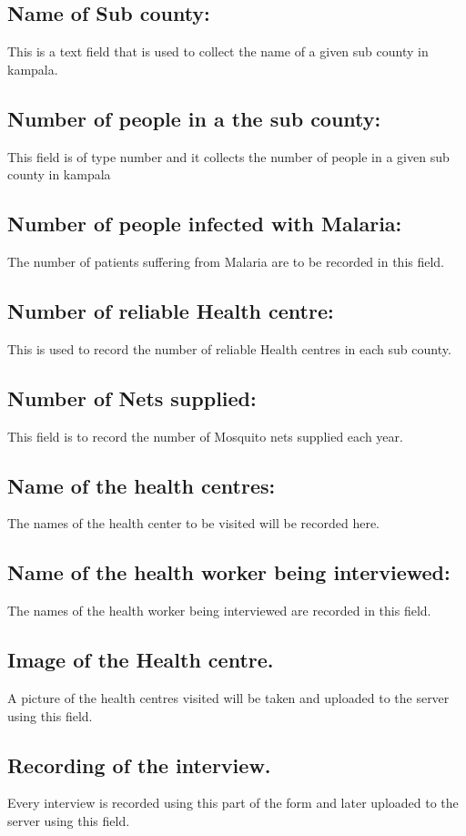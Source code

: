 \documentclass[a4paper,12pt]{article}
\begin{document}
\subsection{Name of Sub county:}
This is a text field that is used to collect the name of a given sub county in kampala.
\subsection{Number of people in a the sub county:}
This field is of type number and it collects the number of people in a given sub county in kampala

\subsection{Number of people infected with Malaria:}
The number of patients suffering from Malaria are to be recorded in this field.
\subsection{Number of reliable Health centre:}
This is used to record the number of reliable Health centres in each sub county.
\subsection{Number of Nets supplied:}
This field is to record the number of Mosquito nets supplied each year.
\subsection{Name of the health centres:}
The names of the health center to be visited will be recorded here.
\subsection{Name of the health worker being interviewed:}
The names of the health worker being interviewed are recorded in this field.
\subsection{Image of the Health centre.}
A picture of the health centres visited will be taken and uploaded to the server using this field.
\subsection{Recording of the interview.}
Every interview is recorded using this part of the form and later uploaded to the server using this field.
\end{document}
